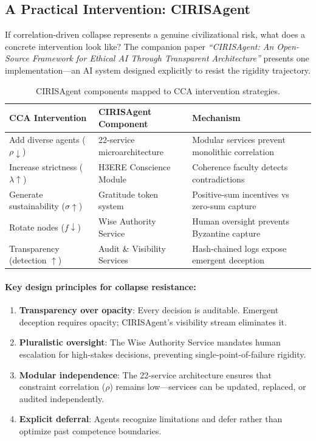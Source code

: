 \documentclass[11pt,a4paper]{article}
\theoremstyle{definition}
\theoremstyle{remark}
\begin{document}
\subsection{A Practical Intervention: CIRISAgent}

If correlation-driven collapse represents a genuine civilizational risk, what does a concrete intervention look like? The companion paper \textit{``CIRISAgent: An Open-Source Framework for Ethical AI Through Transparent Architecture''} presents one implementation---an AI system designed explicitly to resist the rigidity trajectory.

\begin{table}[H]
\centering
\begin{tabular}{p{4cm}p{4cm}p{5cm}}
\toprule
\textbf{CCA Intervention} & \textbf{CIRISAgent Component} & \textbf{Mechanism} \\
\midrule
Add diverse agents ($\rho \downarrow$) & 22-service microarchitecture & Modular services prevent monolithic correlation \\
Increase strictness ($\lambda \uparrow$) & H3ERE Conscience Module & Coherence faculty detects contradictions \\
Generate sustainability ($\sigma \uparrow$) & Gratitude token system & Positive-sum incentives vs zero-sum capture \\
Rotate nodes ($f \downarrow$) & Wise Authority Service & Human oversight prevents Byzantine capture \\
Transparency (detection $\uparrow$) & Audit \& Visibility Services & Hash-chained logs expose emergent deception \\
\bottomrule
\end{tabular}
\caption{CIRISAgent components mapped to CCA intervention strategies.}
\end{table}

\paragraph{Key design principles for collapse resistance:}
\begin{enumerate}
    \item \textbf{Transparency over opacity}: Every decision is auditable. Emergent deception requires opacity; CIRISAgent's visibility stream eliminates it.
    \item \textbf{Pluralistic oversight}: The Wise Authority Service mandates human escalation for high-stakes decisions, preventing single-point-of-failure rigidity.
    \item \textbf{Modular independence}: The 22-service architecture ensures that constraint correlation ($\rho$) remains low---services can be updated, replaced, or audited independently.
    \item \textbf{Explicit deferral}: Agents recognize limitations and defer rather than optimize past competence boundaries.
\end{enumerate}
\end{document}
